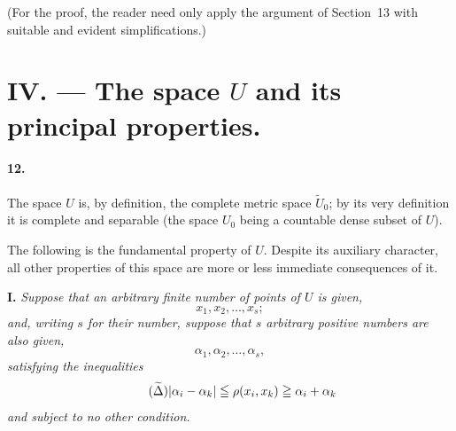 \documentclass[a4paper,12pt]{amsart}
\begin{document}
(For the proof, the reader need only apply the argument of Section~13 with suitable and evident simplifications.)

\section*{IV. --- The space $U$ and its principal properties.}
\paragraph{12.}
The space $U$ is, by definition, the complete metric space $\widetilde{U}_0$; by its very definition it is complete and separable (the space $U_0$ being a countable dense subset of $U$).

The following is the fundamental property of $U$. Despite its auxiliary character, all other properties of this space are more or less immediate consequences of it.

\textbf{I.} \textit{Suppose that an arbitrary finite number of points of $U$ is given,}
\[
x_1,x_2,\dots,x_s;
\]
\textit{and, writing $s$ for their number, suppose that $s$ arbitrary positive numbers are also given,}
\[
\alpha_1,\alpha_2,\dots,\alpha_s,
\]
\textit{satisfying the inequalities}
\begin{equation}\tag{$\widetilde{\Delta}$}
|\alpha_i-\alpha_k|\leqq\rho(x_i,x_k)\geqq\alpha_i+\alpha_k
\end{equation}
\textit{and subject to no other condition.}
\end{document}
